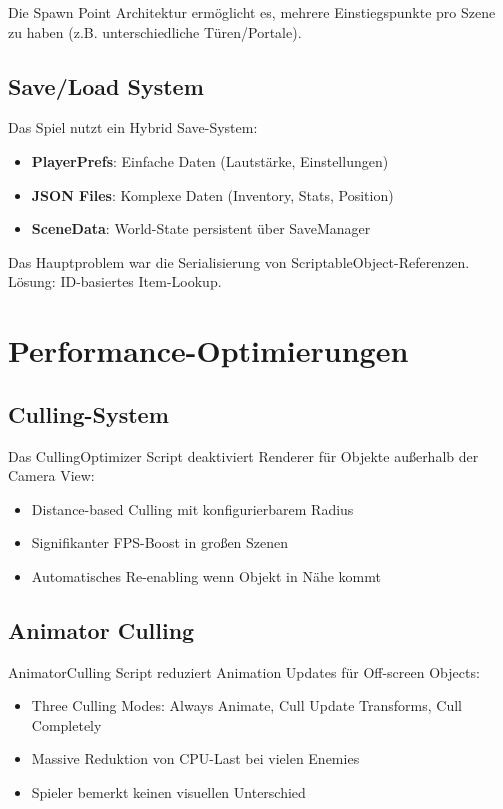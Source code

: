 \documentclass[
  a4paper,
  11pt,
  ngerman,
  parskip=half,
  bibliography=totoc,
  listof=totoc
]{scrreprt}
\begin{document}
Die Spawn Point Architektur ermöglicht es, mehrere Einstiegspunkte pro Szene zu haben (z.B. unterschiedliche Türen/Portale).

\subsection{Save/Load System}

Das Spiel nutzt ein Hybrid Save-System:

\begin{itemize}
    \item \textbf{PlayerPrefs}: Einfache Daten (Lautstärke, Einstellungen)
    \item \textbf{JSON Files}: Komplexe Daten (Inventory, Stats, Position)
    \item \textbf{SceneData}: World-State persistent über SaveManager
\end{itemize}

Das Hauptproblem war die Serialisierung von ScriptableObject-Referenzen. Lösung: ID-basiertes Item-Lookup.

\section{Performance-Optimierungen}

\subsection{Culling-System}

Das CullingOptimizer Script deaktiviert Renderer für Objekte außerhalb der Camera View:

\begin{itemize}
    \item Distance-based Culling mit konfigurierbarem Radius
    \item Signifikanter FPS-Boost in großen Szenen
    \item Automatisches Re-enabling wenn Objekt in Nähe kommt
\end{itemize}

\subsection{Animator Culling}

AnimatorCulling Script reduziert Animation Updates für Off-screen Objects:

\begin{itemize}
    \item Three Culling Modes: Always Animate, Cull Update Transforms, Cull Completely
    \item Massive Reduktion von CPU-Last bei vielen Enemies
    \item Spieler bemerkt keinen visuellen Unterschied
\end{itemize}
\end{document}
